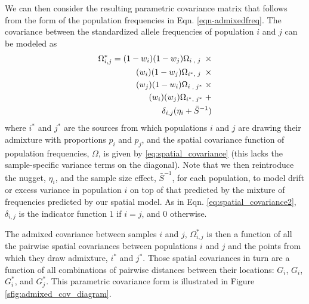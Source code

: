 \documentclass[12pt]{article}
\newcommand{\kadmixsource}[1]{{$G^{*}_{#1}$}}
\newcommand{\identifyadmixsource}[1]{{#1^{*}}}
\begin{document}
We can then consider the resulting parametric covariance matrix that follows from the form of the population frequencies in Eqn. \eqref{eqn-admixedfreq}. The covariance between the standardized allele frequencies of population $i$ and $j$ can be modeled as 
\begin{alignat}{3}
\label{eq:admixed_covariance_1}
\identifyadmixsource{\Omega_{i,j}} = (1-w_i)(1-w_j) \Omega_{i\;,\;j\;} \; \times&\\
(w_i)(1-w_j) \Omega_{\identifyadmixsource{i},\;j\;} \; \times   \notag&\\
(w_j)(1-w_i) \Omega_{i\;,\;\identifyadmixsource{j}} \; \times   \notag&\\
(w_i)(w_j) \Omega_{\identifyadmixsource{i},\;\identifyadmixsource{j}} \; +   \notag&\\
\delta_{i,j} (\eta_i + \bar{S}^{-1}) \notag&
\end{alignat}
where $\identifyadmixsource{i}$ and $\identifyadmixsource{j}$ are the sources from which populations $i$ and $j$ are drawing their admixture with proportions $p_i$ and $p_j$, and the spatial covariance function of population frequencies, $\Omega$, is given by \eqref{eq:spatial_covariance} (this lacks the sample-specific variance terms on the diagonal). Note that we then reintroduce the nugget, $\eta_i$, and the sample size effect, $\bar{S}^{-1}$, for each population, to model drift or excess variance in population $i$ on top of that predicted by the mixture of frequencies predicted by our spatial model.  As in Eqn. \eqref{eq:spatial_covariance2}, $\delta_{i,j} $ is the indicator function $1$ if $i=j$, and $0$ otherwise. 


The admixed covariance between samples $i$ and $j$, $\identifyadmixsource{\Omega_{i,j}}$ is then a function of all the pairwise spatial covariances between populations $i$ and $j$ and the points from which they draw admixture, $\identifyadmixsource{i}$ and $\identifyadmixsource{j}$.  Those spatial covariances in turn are a function of all combinations of pairwise distances between their locations: $G_i$, $G_i$, \kadmixsource{i}, and \kadmixsource{j}.  This parametric covariance form is illustrated in Figure \ref{sfig:admixed_cov_diagram}.
\end{document}

